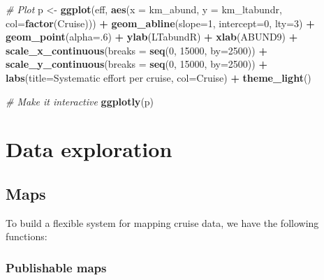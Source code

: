 \documentclass[
]{book}
\newenvironment{Shaded}{\begin{snugshade}}{\end{snugshade}}
\newcommand{\AttributeTok}[1]{\textcolor[rgb]{0.13,0.29,0.53}{#1}}
\newcommand{\CommentTok}[1]{\textcolor[rgb]{0.56,0.35,0.01}{\textit{#1}}}
\newcommand{\DecValTok}[1]{\textcolor[rgb]{0.00,0.00,0.81}{#1}}
\newcommand{\FunctionTok}[1]{\textcolor[rgb]{0.13,0.29,0.53}{\textbf{#1}}}
\newcommand{\NormalTok}[1]{#1}
\newcommand{\OtherTok}[1]{\textcolor[rgb]{0.56,0.35,0.01}{#1}}
\newcommand{\SpecialCharTok}[1]{\textcolor[rgb]{0.81,0.36,0.00}{\textbf{#1}}}
\newcommand{\StringTok}[1]{\textcolor[rgb]{0.31,0.60,0.02}{#1}}
\begin{document}
\begin{Shaded}
\begin{Highlighting}[]
\CommentTok{\# Plot}
\NormalTok{p }\OtherTok{\textless{}{-}} 
  \FunctionTok{ggplot}\NormalTok{(eff, }\FunctionTok{aes}\NormalTok{(}\AttributeTok{x =}\NormalTok{ km\_abund, }\AttributeTok{y =}\NormalTok{ km\_ltabundr, }\AttributeTok{col=}\FunctionTok{factor}\NormalTok{(Cruise))) }\SpecialCharTok{+}
  \FunctionTok{geom\_abline}\NormalTok{(}\AttributeTok{slope=}\DecValTok{1}\NormalTok{, }\AttributeTok{intercept=}\DecValTok{0}\NormalTok{, }\AttributeTok{lty=}\DecValTok{3}\NormalTok{) }\SpecialCharTok{+} 
  \FunctionTok{geom\_point}\NormalTok{(}\AttributeTok{alpha=}\NormalTok{.}\DecValTok{6}\NormalTok{) }\SpecialCharTok{+} 
  \FunctionTok{ylab}\NormalTok{(}\StringTok{\textquotesingle{}LTabundR\textquotesingle{}}\NormalTok{) }\SpecialCharTok{+} \FunctionTok{xlab}\NormalTok{(}\StringTok{\textquotesingle{}ABUND9\textquotesingle{}}\NormalTok{) }\SpecialCharTok{+} 
  \FunctionTok{scale\_x\_continuous}\NormalTok{(}\AttributeTok{breaks =} \FunctionTok{seq}\NormalTok{(}\DecValTok{0}\NormalTok{, }\DecValTok{15000}\NormalTok{, }\AttributeTok{by=}\DecValTok{2500}\NormalTok{)) }\SpecialCharTok{+} 
  \FunctionTok{scale\_y\_continuous}\NormalTok{(}\AttributeTok{breaks =} \FunctionTok{seq}\NormalTok{(}\DecValTok{0}\NormalTok{, }\DecValTok{15000}\NormalTok{, }\AttributeTok{by=}\DecValTok{2500}\NormalTok{)) }\SpecialCharTok{+} 
  \FunctionTok{labs}\NormalTok{(}\AttributeTok{title=}\StringTok{\textquotesingle{}Systematic effort per cruise\textquotesingle{}}\NormalTok{, }\AttributeTok{col=}\StringTok{\textquotesingle{}Cruise\textquotesingle{}}\NormalTok{) }\SpecialCharTok{+} 
  \FunctionTok{theme\_light}\NormalTok{()}

\CommentTok{\# Make it interactive}
\FunctionTok{ggplotly}\NormalTok{(p)}
\end{Highlighting}
\end{Shaded}

\hypertarget{part-data-exploration}{%
\part{Data exploration}\label{part-data-exploration}}

\hypertarget{maps}{%
\chapter{Maps}\label{maps}}

To build a flexible system for mapping cruise data, we have the following functions:

\hypertarget{publishable-maps}{%
\section*{Publishable maps}\label{publishable-maps}}
\end{document}
